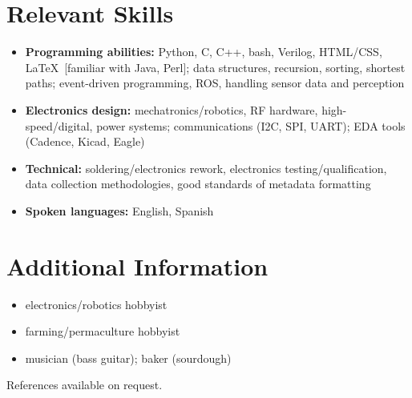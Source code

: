 \documentclass[10pt, letterpaper]{article}
\begin{document}
	\section*{Relevant Skills}
	\begin{flushleft}
		\begin{itemize}
			\item \textbf{Programming abilities:} Python, C, C++, bash, Verilog, HTML/CSS, \LaTeX \ [familiar with Java, Perl]; data structures, recursion, sorting, shortest paths; event-driven programming, ROS, handling sensor data and perception
			\item \textbf{Electronics design:} mechatronics/robotics, RF hardware, high-speed/digital, power systems; communications (I2C, SPI, UART); EDA tools (Cadence, Kicad, Eagle)
			\item \textbf{Technical:} soldering/electronics rework, electronics testing/qualification, data collection methodologies, good standards of metadata formatting
			\item \textbf{Spoken languages:} English, Spanish
		\end{itemize}
	\end{flushleft}
	\section*{Additional Information}
	\begin{flushleft}
		\begin{itemize}
			\item electronics/robotics hobbyist
			\item farming/permaculture hobbyist
			\item musician (bass guitar); baker (sourdough)
		\end{itemize}
	\end{flushleft}
	References available on request.
\end{document}
